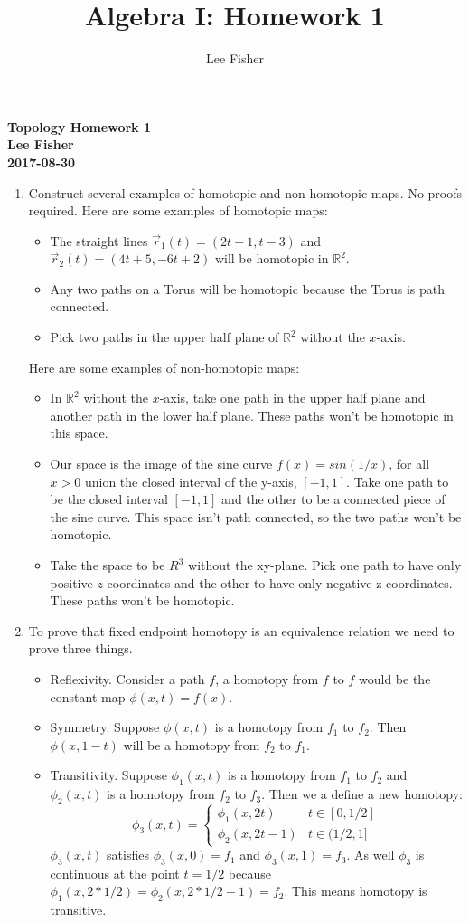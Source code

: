 \documentclass[12pt]{report}
\title{\textbf{Algebra I: Homework 1}}
\author{Lee Fisher}
\date{}
\begin{document}
\textbf{Topology Homework 1}\\
\indent \textbf{Lee Fisher}\\
\indent \textbf{2017-08-30}

\begin{enumerate}
\item Construct several examples of homotopic and non-homotopic maps. No proofs required.
Here are some examples of homotopic maps:
\begin{itemize}
  \item The straight lines $\vec{r}_1(t) = (2t+1,t-3)$ and $\vec{r}_2(t) = (4t+5,-6t+2)$ will be homotopic in $\mathbb{R}^2$.
  \item Any two paths on a Torus will be homotopic because the Torus is path connected.
  \item Pick two paths in the upper half plane of $\mathbb{R}^2$ without the $x$-axis.
\end{itemize}

Here are some examples of non-homotopic maps:
\begin{itemize}
  \item In $\mathbb{R}^2$ without the $x$-axis, take one path in the upper half plane and another path in the
        lower half plane. These paths won't be homotopic in this space.
  \item Our space is the image of the sine curve $f(x) = sin(1/x)$, for all $x >0$ union the closed interval of the
        y-axis, $[-1,1]$. Take one path to be the closed interval $[-1,1]$ and the other to be a connected piece of the
        sine curve. This space isn't path connected, so the two paths won't be homotopic.
  \item Take the space to be $R^3$ without the xy-plane. Pick one path to have only positive $z$-coordinates and the
        other to have only negative z-coordinates. These paths won't be homotopic.
\end{itemize}

\item To prove that fixed endpoint homotopy is an equivalence relation we need to prove three things.
\begin{itemize}
  \item Reflexivity. Consider a path $f$, a homotopy from $f$ to $f$ would be the constant map $\phi(x,t) = f(x)$.
  \item Symmetry. Suppose $\phi(x,t)$ is a homotopy from $f_1$ to $f_2$. Then $\phi(x,1-t)$ will be a homotopy from
        $f_2$ to $f_1$.
  \item Transitivity. Suppose $\phi_1(x,t)$ is a homotopy from $f_1$ to $f_2$ and $\phi_2(x,t)$ is a homotopy from $f_2$
        to $f_3$. Then we a define a new homotopy:
        \[ \phi_3(x,t) = \begin{cases}
        \phi_1(x,2t) & t \in [0,1/2] \\
        \phi_2(x,2t-1) & t \in (1/2,1]
        \end{cases} \]
        $\phi_3(x,t)$ satisfies $\phi_3(x,0) = f_1$ and $\phi_3(x,1) = f_3$. As well $\phi_3$ is continuous at the point
        $t = 1/2$ because $\phi_1(x,2*1/2) = \phi_2(x,2*1/2-1) = f_2$. This means homotopy is transitive.
\end{itemize}


\end{enumerate}
\end{document}
